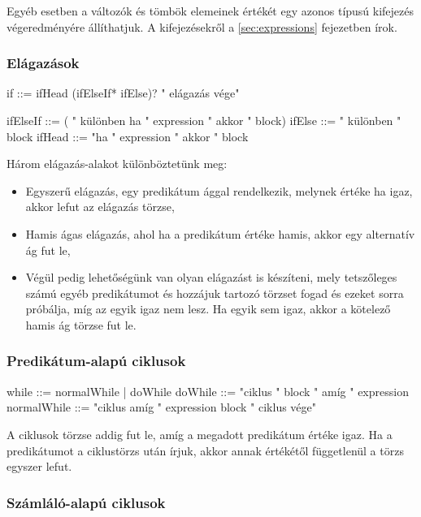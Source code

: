 Egyéb esetben a változók és tömbök elemeinek értékét egy azonos típusú kifejezés végeredményére állíthatjuk. A kifejezésekről a \ref{sec:expressions} fejezetben írok.

\subsubsection{Elágazások}

\begin{ebnf}
if ::= ifHead (ifElseIf* ifElse)? " elágazás vége"

ifElseIf ::= ( " különben ha " expression " akkor " block)
ifElse ::= " különben " block
ifHead ::= "ha " expression " akkor " block 
\end{ebnf}

Három elágazás-alakot különböztetünk meg:

\begin{itemize}
    \item Egyszerű elágazás, egy predikátum ággal rendelkezik, melynek értéke ha igaz, akkor lefut az elágazás törzse,
    \item Hamis ágas elágazás, ahol ha a predikátum értéke hamis, akkor egy alternatív ág fut le,
    \item Végül pedig lehetőségünk van olyan elágazást is készíteni, mely tetszőleges számú egyéb predikátumot és hozzájuk tartozó törzset fogad és ezeket sorra próbálja, míg az egyik igaz nem lesz. Ha egyik sem igaz, akkor a kötelező hamis ág törzse fut le.
\end{itemize}

\subsubsection{Predikátum-alapú ciklusok}

\begin{ebnf}
while ::= normalWhile | doWhile
doWhile ::= "ciklus " block " amíg " expression
normalWhile ::= "ciklus amíg " expression block " ciklus vége"
\end{ebnf}

A ciklusok törzse addig fut le, amíg a megadott predikátum értéke igaz. Ha a predikátumot a ciklustörzs után írjuk, akkor annak értékétől függetlenül a törzs egyszer lefut.

\subsubsection{Számláló-alapú ciklusok}


